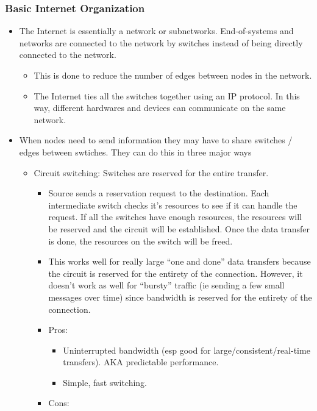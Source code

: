 \hypertarget{basic-internet-organization}{%
\subsubsection{Basic Internet
Organization}\label{basic-internet-organization}}

\begin{itemize}
\tightlist
\item
  The Internet is essentially a network or subnetworks. End-of-systems
  and networks are connected to the network by switches instead of being
  directly connected to the network.

  \begin{itemize}
  \tightlist
  \item
    This is done to reduce the number of edges between nodes in the
    network.
  \item
    The Internet ties all the switches together using an IP protocol. In
    this way, different hardwares and devices can communicate on the
    same network.
  \end{itemize}
\item
  When nodes need to send information they may have to share switches /
  edges between swtiches. They can do this in three major ways

  \begin{itemize}
  \tightlist
  \item
    Circuit switching: Switches are reserved for the entire transfer.

    \begin{itemize}
    \tightlist
    \item
      Source sends a reservation request to the destination. Each
      intermediate switch checks it's resources to see if it can handle
      the request. If all the switches have enough resources, the
      resources will be reserved and the circuit will be established.
      Once the data transfer is done, the resources on the switch will
      be freed.
    \item
      This works well for really large ``one and done'' data transfers
      because the circuit is reserved for the entirety of the
      connection. However, it doesn't work as well for ``bursty''
      traffic (ie sending a few small messages over time) since
      bandwidth is reserved for the entirety of the connection.
    \item
      Pros:

      \begin{itemize}
      \tightlist
      \item
        Uninterrupted bandwidth (esp good for large/consistent/real-time
        transfers). AKA predictable performance.
      \item
        Simple, fast switching.
      \end{itemize}
    \item
      Cons:


\end{itemize}
\end{itemize}
\end{itemize}
